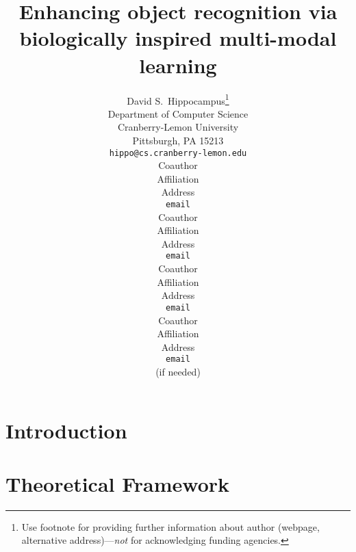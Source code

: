 \documentclass{article}
\title{\title{Enhancing object recognition via\\
biologically inspired multi-modal learning}
}
\author{
David S.~Hippocampus\thanks{ Use footnote for providing further information
about author (webpage, alternative address)---\emph{not} for acknowledging
funding agencies.} \\
Department of Computer Science\\
Cranberry-Lemon University\\
Pittsburgh, PA 15213 \\
\texttt{hippo@cs.cranberry-lemon.edu} \\
\And
Coauthor \\
Affiliation \\
Address \\
\texttt{email} \\
\AND
Coauthor \\
Affiliation \\
Address \\
\texttt{email} \\
\And
Coauthor \\
Affiliation \\
Address \\
\texttt{email} \\
\And
Coauthor \\
Affiliation \\
Address \\
\texttt{email} \\
(if needed)\\
}
\begin{document}
\makeanontitle

\begin{abstract}

\end{abstract}

\section{Introduction}
\label{sec:intro}




\section{Theoretical Framework}
\label{sec::framework}

\end{document}
